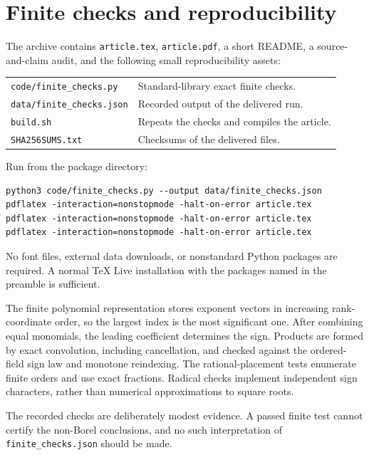 \documentclass[11pt,a4paper]{article}
\numberwithin{equation}{section}
\theoremstyle{definition}
\theoremstyle{remark}
\begin{document}
\section{Finite checks and reproducibility}
\label{csf:app:checks}

The archive contains \texttt{article.tex}, \texttt{article.pdf}, a short
README, a source-and-claim audit, and the following small reproducibility
assets:
\begin{center}
\begin{tabular}{ll}
\toprule
\texttt{code/finite\_checks.py} & Standard-library exact finite checks.\\
\texttt{data/finite\_checks.json} & Recorded output of the delivered run.\\
\texttt{build.sh} & Repeats the checks and compiles the article.\\
\texttt{SHA256SUMS.txt} & Checksums of the delivered files.\\
\bottomrule
\end{tabular}
\end{center}
Run from the package directory:
\begin{lstlisting}
python3 code/finite_checks.py --output data/finite_checks.json
pdflatex -interaction=nonstopmode -halt-on-error article.tex
pdflatex -interaction=nonstopmode -halt-on-error article.tex
pdflatex -interaction=nonstopmode -halt-on-error article.tex
\end{lstlisting}
No font files, external data downloads, or nonstandard Python packages are
required. A normal TeX Live installation with the packages named in the
preamble is sufficient.

The finite polynomial representation stores exponent vectors in increasing
rank-coordinate order, so the largest index is the most significant one.
After combining equal monomials, the leading coefficient determines the
sign. Products are formed by exact convolution, including cancellation,
and checked against the ordered-field sign law and monotone reindexing.
The rational-placement tests enumerate finite orders and use exact
fractions. Radical checks implement independent sign characters, rather
than numerical approximations to square roots.

The recorded checks are deliberately modest evidence. A passed finite test
cannot certify the non-Borel conclusions, and no such interpretation of
\texttt{finite\_checks.json} should be made.
\end{document}
